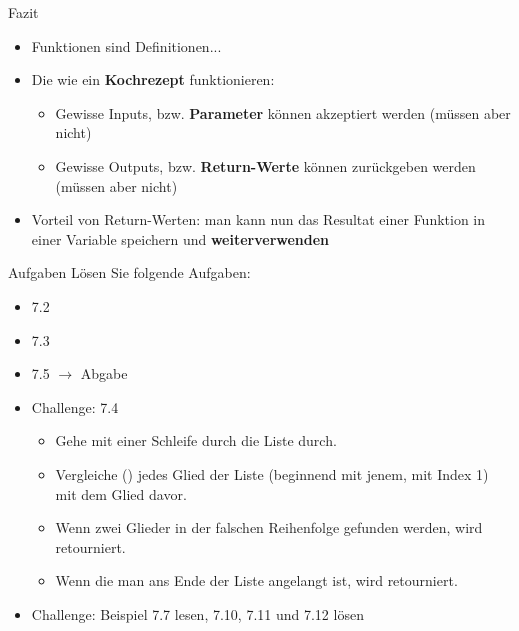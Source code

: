 \begin{frame}{Fazit}
\begin{itemize}[<+->]
	\item Funktionen sind Definitionen...
	\item Die wie ein \textbf{Kochrezept} funktionieren:
	\begin{itemize}
		\item Gewisse Inputs, bzw. \textbf{Parameter} können akzeptiert werden (müssen aber nicht)
		\item Gewisse Outputs, bzw. \textbf{Return-Werte }können zurückgeben werden (müssen aber nicht)
	\end{itemize}
	\item {} Vorteil von Return-Werten: man kann nun das Resultat einer Funktion in einer Variable speichern und \textbf{weiterverwenden}
\end{itemize}
\end{frame}

\begin{frame}{Aufgaben}
	Lösen Sie folgende Aufgaben:
	\begin{itemize}
	    \item 7.2
	    \item 7.3
	    \item 7.5 $\rightarrow$ Abgabe
	    \item {} Challenge: 7.4
	    \begin{itemize}
	    	\item Gehe mit einer Schleife durch die Liste durch.
	    	\item Vergleiche () jedes Glied der Liste (beginnend mit jenem, mit Index 1) mit dem Glied davor. 
	    	\item Wenn zwei Glieder in der falschen Reihenfolge gefunden werden, wird  retourniert.
	    	\item Wenn die man ans Ende der Liste angelangt ist, wird  retourniert.
	    \end{itemize}
	    \item {} Challenge: Beispiel 7.7 lesen, 7.10, 7.11 und 7.12 lösen
	\end{itemize}
\end{frame}
